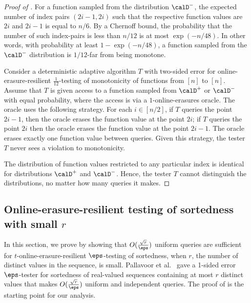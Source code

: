 \documentclass{toc}
\begin{document}
\begin{proof}[Proof of ]
	For a function sampled from the distribution $\calD^-$, the expected number of index pairs $(2i-1, 2i)$ such that the respective function values are $2i$ and $2i-1$ is equal to $n/6$. 
	By a Chernoff bound, the probability that the number of such index-pairs is less than $n/12$ is at most $\exp(-n/48)$.
	In other words, with probability at least $1 - \exp(-n/48)$, a function sampled from the $\calD^-$ distribution is $1/12$-far from being monotone.
	
	Consider a deterministic adaptive algorithm $T$ with two-sided error for online-erasure-resilient $\frac{1}{12}$-testing of monotonicity of functions from $[n]$ to $[n]$. 
	Assume that $T$ is given access to a function sampled from $\calD^+$ or $\calD^-$ with equal probability, where the access is via a $1$-online-erasures oracle.
	The oracle uses the following strategy.
	For each $i \in [n/2]$, if $T$ queries the point $2i-1$, then the oracle erases the function value at the point $2i$; if $T$ queries the point $2i$ then the oracle erases the function value at the point $2i-1$. The oracle erases exactly one function value between queries. Given this strategy, the tester $T$ never sees a violation to monotonicity. 
	
	The distribution of function values restricted to any particular index is identical for distributions $\calD^+$ and $\calD^-$. Hence, the tester $T$ cannot distinguish the distributions, no matter how many queries it makes. 
\end{proof}



%
\subsection{Online-erasure-resilient testing of sortedness with small $r$}

In this section, we prove  by showing that $O(\frac{\sqrt{r}}{\eps})$ uniform queries are sufficient for $t$-online-erasure-resilient $\eps$-testing of sortedness, when $r$, the number of distinct values in the sequence, is small. 
Pallavoor et al.~\cite{PRV18} gave a 1-sided error $\eps$-tester for sortedness of real-valued sequences containing at most $r$ distinct values that makes $O(\frac{\sqrt{r}}{\eps})$ uniform and independent queries. 
The proof of \cite[Theorem 1.5]{PRV18} is the starting point for our analysis. 
\end{document}
